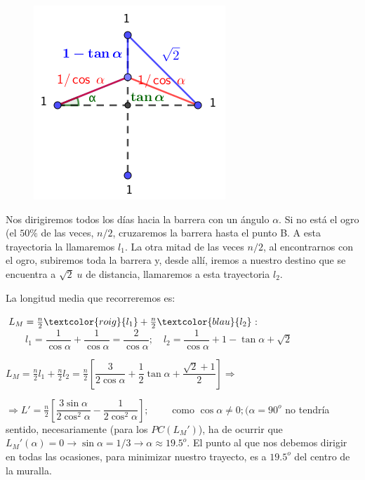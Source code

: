 	\begin{proofw}\renewcommand{\qedsymbol}{$\diamond$}
	
	\begin{multicols}{2}
	
	\begin{figure}[H]
	\centering
	\includegraphics[width=.35\textwidth]{imagenes/imagenes05/T05IM21.png}
	\end{figure}
	
	\small{Nos dirigiremos todos los días hacia la barrera con un ángulo $\alpha$. Si no está el ogro (el $50\%$ de las veces, $n/2$,  cruzaremos la barrera hasta el punto B. A esta trayectoria la llamaremos \textcolor{roig}{$l_1$}. La otra mitad de las veces $n/2$, al encontrarnos con el ogro, subiremos toda la barrera y, desde allí, iremos a nuestro destino que se encuentra a $\sqrt{2}\; u$ de distancia, llamaremos a esta trayectoria \textcolor{blau}{$l_2$}.}
		
	\end{multicols}

\normalsize{La longitud media que recorreremos es}: 

$L_M=\frac n 2 \textcolor{roig}{l_1}+\frac n 2 \textcolor{blau}{l_2}$: $\qquad l_1= \dfrac {1}{\cos \alpha} + \dfrac {1}{\cos \alpha} =\dfrac {2}{\cos \alpha} ; \quad l_2=\dfrac {1}{\cos \alpha} +1-\tan \alpha + \sqrt{2}$
	
	$ L_M=\frac n 2 l_1 + \frac n 2 l_2= \frac n 2  \left[ \dfrac {3}{2 \cos \alpha} + \dfrac {1} {2} \tan \alpha+ \dfrac {\sqrt{2}+1}{2} \right] \Rightarrow$
	
	$\Rightarrow L'=\frac n 2 \left[ \dfrac {3 \sin \alpha}{2 \cos^2 \alpha} - \dfrac {1}{2 \cos^2 \alpha} \right]; \qquad $ como $\cos \alpha \neq 0; (\alpha = 90^o$ no tendría sentido, necesariamente (para los $PC(L_M')$), ha de ocurrir que $L_M'(\alpha)=0 \to \sin \alpha = 1/3 \to \alpha\approx19.5^o$. El punto al que nos debemos dirigir en todas las ocasiones, para minimizar nuestro trayecto, es a $19.5^o$ del centro de la muralla.
	
	\end{proofw}
	
